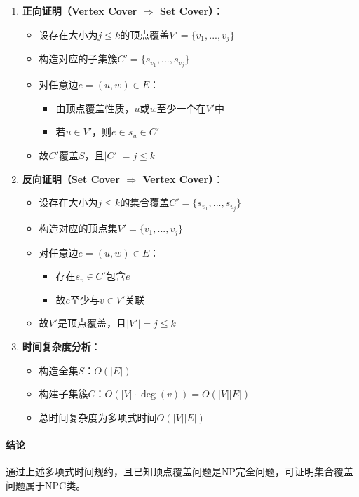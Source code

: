 \documentclass[./../main.tex]{subfiles}
\begin{document}
\begin{enumerate}
    \item \textbf{正向证明（Vertex Cover $\Rightarrow$ Set Cover）}：
    \begin{itemize}
        \item 设存在大小为$j \leq k$的顶点覆盖$V' = \{v_1,...,v_j\}$
        \item 构造对应的子集簇$C' = \{s_{v_1},...,s_{v_j}\}$
        \item 对任意边$e=(u,w)\in E$：
        \begin{itemize}
            \item 由顶点覆盖性质，$u$或$w$至少一个在$V'$中
            \item 若$u\in V'$，则$e\in s_u \in C'$
        \end{itemize}
        \item 故$C'$覆盖$S$，且$|C'|=j\leq k$
    \end{itemize}

    \item \textbf{反向证明（Set Cover $\Rightarrow$ Vertex Cover）}：
    \begin{itemize}
        \item 设存在大小为$j \leq k$的集合覆盖$C' = \{s_{v_1},...,s_{v_j}\}$
        \item 构造对应的顶点集$V' = \{v_1,...,v_j\}$
        \item 对任意边$e=(u,w)\in E$：
        \begin{itemize}
            \item 存在$s_v\in C'$包含$e$
            \item 故$e$至少与$v\in V'$关联
        \end{itemize}
        \item 故$V'$是顶点覆盖，且$|V'|=j\leq k$
    \end{itemize}

    \item \textbf{时间复杂度分析}：
    \begin{itemize}
        \item 构造全集$S$：$O(|E|)$
        \item 构建子集簇$C$：$O(|V|\cdot \deg(v)) = O(|V||E|)$
        \item 总时间复杂度为多项式时间$O(|V||E|)$
    \end{itemize}
\end{enumerate}

\paragraph{结论}
通过上述多项式时间规约，且已知顶点覆盖问题是NP完全问题，可证明集合覆盖问题属于NPC类。
\end{document}
